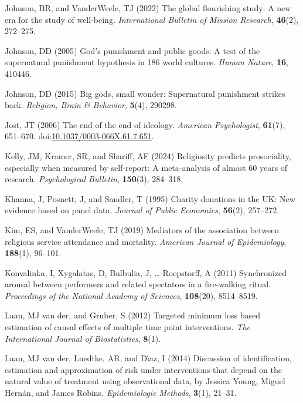 \documentclass[
  single column]{article}
\newlength{\cslhangindent}
\newenvironment{CSLReferences}[2] %
 {\begin{list}{}{%
  \setlength{\itemindent}{0pt}
  \setlength{\leftmargin}{0pt}
  \setlength{\parsep}{0pt}
  \ifodd #1
   \setlength{\leftmargin}{\cslhangindent}
   \setlength{\itemindent}{-1\cslhangindent}
  \fi
  \setlength{\itemsep}{#2\baselineskip}}}
 {\end{list}}
\begin{document}
\begin{CSLReferences}{1}{0}
Johnson, BR, and VanderWeele, TJ (2022) The global flourishing study: A
new era for the study of well-being. \emph{International Bulletin of
Mission Research}, \textbf{46}(2), 272--275.

Johnson, DD (2005) God{'}s punishment and public goods: A test of the
supernatural punishment hypothesis in 186 world cultures. \emph{Human
Nature}, \textbf{16}, 410446.

Johnson, DD (2015) Big gods, small wonder: Supernatural punishment
strikes back. \emph{Religion, Brain \& Behavior}, \textbf{5}(4), 290298.

Jost, JT (2006) The end of the end of ideology. \emph{American
Psychologist}, \textbf{61}(7), 651--670.
doi:\href{https://doi.org/10.1037/0003-066X.61.7.651}{10.1037/0003-066X.61.7.651}.

Kelly, JM, Kramer, SR, and Shariff, AF (2024) Religiosity predicts
prosociality, especially when measured by self-report: A meta-analysis
of almost 60 years of research. \emph{Psychological Bulletin},
\textbf{150}(3), 284--318.

Khanna, J, Posnett, J, and Sandler, T (1995) Charity donations in the
UK: New evidence based on panel data. \emph{Journal of Public
Economics}, \textbf{56}(2), 257--272.

Kim, ES, and VanderWeele, TJ (2019) Mediators of the association between
religious service attendance and mortality. \emph{American Journal of
Epidemiology}, \textbf{188}(1), 96--101.

Konvalinka, I, Xygalatas, D, Bulbulia, J, \ldots{} Roepstorff, A (2011)
Synchronized arousal between performers and related spectators in a
fire-walking ritual. \emph{Proceedings of the National Academy of
Sciences}, \textbf{108}(20), 8514--8519.

Laan, MJ van der, and Gruber, S (2012) Targeted minimum loss based
estimation of causal effects of multiple time point interventions.
\emph{The International Journal of Biostatistics}, \textbf{8}(1).

Laan, MJ van der, Luedtke, AR, and Dı́az, I (2014) Discussion of
identification, estimation and approximation of risk under interventions
that depend on the natural value of treatment using observational data,
by {J}essica {Y}oung, {M}iguel {H}ern{á}n, and {J}ames {R}obins.
\emph{Epidemiologic Methods}, \textbf{3}(1), 21--31.


\end{CSLReferences}
\end{document}
